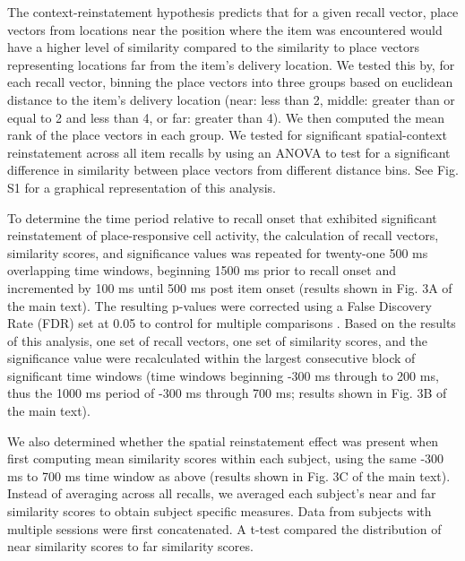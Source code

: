 The context-reinstatement hypothesis predicts that for a given recall vector, place vectors from locations near the position where the item was encountered would have a higher level of similarity compared to the similarity to place vectors representing locations far from the item's delivery location.  We tested this by, for each recall vector, binning the place vectors into three groups based on euclidean distance to the item's delivery location (near: less than 2, middle: greater than or equal to 2 and less than 4, or far: greater than 4). We then computed the mean rank of the place vectors in each group.  We tested for significant spatial-context reinstatement across all item recalls by using an ANOVA to test for a significant difference in similarity between place vectors from different distance bins. See Fig. S1 for a graphical representation of this analysis.

To determine the time period relative to recall onset that exhibited significant reinstatement of place-responsive cell activity, the calculation of recall vectors, similarity scores, and significance values was repeated for twenty-one 500 ms overlapping time windows, beginning 1500 ms prior to recall onset and incremented by 100 ms until 500 ms post item onset (results shown in Fig. 3A of the main text).  The resulting p-values were corrected using a False Discovery Rate (FDR) set at 0.05 to control for multiple comparisons \cite{BenjHoch95}. Based on the results of this analysis, one set of recall vectors, one set of similarity scores, and the significance value were recalculated within the largest consecutive block of significant time windows (time windows beginning -300 ms through to 200 ms, thus the 1000 ms period of -300 ms through 700 ms; results shown in Fig. 3B of the main text).

We also determined whether the spatial reinstatement effect was present when first computing mean similarity scores within each subject, using the same -300 ms to 700 ms time window as above (results shown in Fig. 3C of the main text). Instead of averaging across all recalls, we averaged each subject's near and far similarity scores to obtain subject specific measures. Data from subjects with multiple sessions were first concatenated. A t-test compared the distribution of near similarity scores to far similarity scores.

